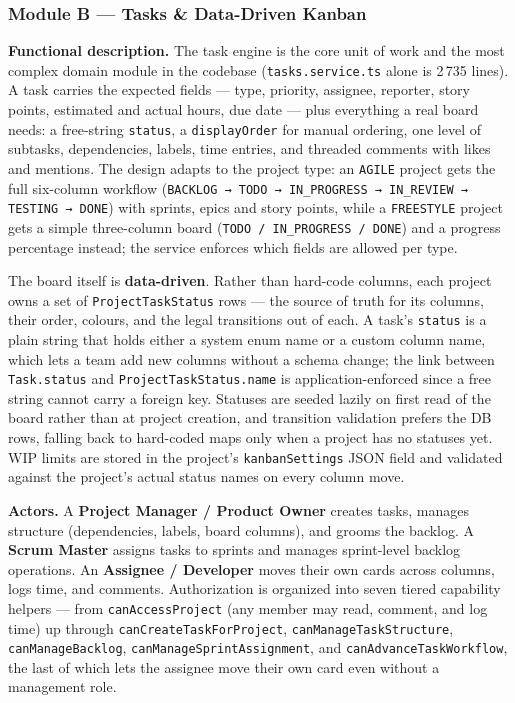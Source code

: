 
\subsubsection{Module B --- Tasks \& Data-Driven Kanban}

\textbf{Functional description.} The task engine is the core unit of work and the most complex
domain module in the codebase (\texttt{tasks.service.ts} alone is 2\,735 lines). A task carries
the expected fields --- type, priority, assignee, reporter, story points, estimated and actual
hours, due date --- plus everything a real board needs: a free-string \texttt{status}, a
\texttt{displayOrder} for manual ordering, one level of subtasks, dependencies, labels, time
entries, and threaded comments with likes and mentions. The design adapts to the project type: an
\texttt{AGILE} project gets the full six-column workflow (\texttt{BACKLOG → TODO → IN\_PROGRESS →
IN\_REVIEW → TESTING → DONE}) with sprints, epics and story points, while a \texttt{FREESTYLE}
project gets a simple three-column board (\texttt{TODO / IN\_PROGRESS / DONE}) and a progress
percentage instead; the service enforces which fields are allowed per type.

The board itself is \textbf{data-driven}. Rather than hard-code columns, each project owns a set
of \texttt{ProjectTaskStatus} rows --- the source of truth for its columns, their order, colours,
and the legal transitions out of each. A task's \texttt{status} is a plain string that holds either
a system enum name or a custom column name, which lets a team add new columns without a schema
change; the link between \texttt{Task.status} and \texttt{ProjectTaskStatus.name} is
application-enforced since a free string cannot carry a foreign key. Statuses are seeded lazily on
first read of the board rather than at project creation, and transition validation prefers the DB
rows, falling back to hard-coded maps only when a project has no statuses yet. WIP limits are
stored in the project's \texttt{kanbanSettings} JSON field and validated against the project's
actual status names on every column move.

\textbf{Actors.} A \textbf{Project Manager / Product Owner} creates tasks, manages structure
(dependencies, labels, board columns), and grooms the backlog. A \textbf{Scrum Master} assigns
tasks to sprints and manages sprint-level backlog operations. An \textbf{Assignee / Developer}
moves their own cards across columns, logs time, and comments. Authorization is organized into
seven tiered capability helpers --- from \texttt{canAccessProject} (any member may read, comment,
and log time) up through \texttt{canCreateTaskForProject}, \texttt{canManageTaskStructure},
\texttt{canManageBacklog}, \texttt{canManageSprintAssignment}, and
\texttt{canAdvanceTaskWorkflow}, the last of which lets the assignee move their own card even
without a management role.

